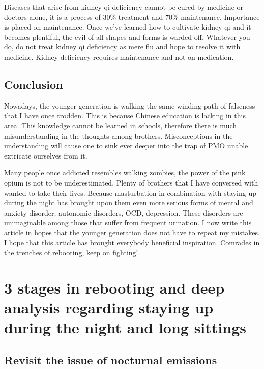 \documentclass[
]{book}
\begin{document}
Diseases that arise from kidney qi deficiency cannot be cured by medicine or doctors alone, it is a process of 30\% treatment and 70\% maintenance. Importance is placed on maintenance. Once we've learned how to cultivate kidney qi and it becomes plentiful, the evil of all shapes and forms is warded off. Whatever you do, do not treat kidney qi deficiency as mere flu and hope to resolve it with medicine. Kidney deficiency requires maintenance and not on medication.

\hypertarget{conclusion}{%
\section{Conclusion}\label{conclusion}}

Nowadays, the younger generation is walking the same winding path of falseness that I have once trodden. This is because Chinese education is lacking in this area. This knowledge cannot be learned in schools, therefore there is much misunderstanding in the thoughts among brothers. Misconceptions in the understanding will cause one to sink ever deeper into the trap of PMO unable extricate ourselves from it.

Many people once addicted resembles walking zombies, the power of the pink opium is not to be underestimated. Plenty of brothers that I have conversed with wanted to take their lives. Because masturbation in combination with staying up during the night has brought upon them even more serious forms of mental and anxiety disorder; autonomic disorders, OCD, depression. These disorders are unimaginable among those that suffer from frequent urination. I now write this article in hopes that the younger generation does not have to repeat my mistakes. I hope that this article has brought everybody beneficial inspiration. Comrades in the trenches of rebooting, keep on fighting!

\hypertarget{stages-in-rebooting-and-deep-analysis-regarding-staying-up-during-the-night-and-long-sittings}{%
\chapter{3 stages in rebooting and deep analysis regarding staying up during the night and long sittings}\label{stages-in-rebooting-and-deep-analysis-regarding-staying-up-during-the-night-and-long-sittings}}

\hypertarget{revisit-the-issue-of-nocturnal-emissions}{%
\section{Revisit the issue of nocturnal emissions}\label{revisit-the-issue-of-nocturnal-emissions}}
\end{document}

